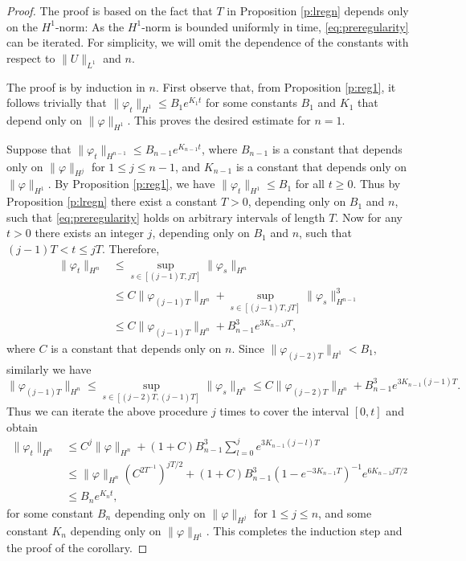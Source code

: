 \documentclass[11pt,a4paper,DIV11]{scrartcl}	%
\begin{document}
\begin{proof}
The proof is based on the fact that $T$ in Proposition \ref{p:lregn} depends only on the $H^1$-norm: As the $H^1$-norm is bounded uniformly in time, \eqref{eq:preregularity} can be iterated. 
  For simplicity, we will omit the dependence of the constants with respect
  to $\| U \|_{L^1}$ and $n$.

  The proof is by induction in $n$. First observe that, from Proposition
  \ref{p:reg1}, it follows trivially that $\| \varphi_t \|_{H^1} \le B_1
  e^{K_1 t}$ for some constants $B_1$ and $K_1$ that depend only on $\|
  \varphi \|_{H^1}$. This proves the desired estimate for $n=1$.

  Suppose that $\| \varphi_t \|_{H^{n-1}} \le B_{n-1} e^{K_{n-1} t}$, where
  $B_{n-1}$ is a constant that depends only on $\| \varphi \|_{H^j}$ for $1
  \le j \le n-1$, and $K_{n-1}$ is a constant that depends only on $\|
  \varphi \|_{H^1}$. By Proposition \ref{p:reg1}, we have $\| \varphi_t
  \|_{H^1} \le B_1$ for all $t \ge 0$.
%
 Thus by Proposition \ref{p:lregn} there exist a constant $T>0$, depending 
  only on $B_1$ and $n$, such that \eqref{eq:preregularity} holds on arbitrary intervals of length $T$. Now for
 any $t > 0$ there exists an integer $j$, depending
  only on $B_1$ and $n$, such that $(j-1)T < t \le jT$. Therefore,
%
  \begin{align*}
    \| \varphi_t \|_{H^n} & \le \sup_{s \in [(j-1)T, jT]} \| \varphi_s
    \|_{H^n} \\
    & \le C \| \varphi_{(j-1)T} \|_{H^n} + \sup_{s \in [(j-1)T, jT]} \|
    \varphi_s \|_{H^{n-1}}^3 \\
    & \le C \| \varphi_{(j-1)T} \|_{H^n} + B_{n-1}^3 e^{3 K_{n-1} j T},
  \end{align*}
  where $C$ is a constant that depends only on $n$. Since $\|
  \varphi_{(j-2)T} \|_{H^1} < B_1$, similarly we have
  \[
    \| \varphi_{(j-1)T} \|_{H^n} \le \sup_{s \in [(j-2)T, (j-1)T]} \|
    \varphi_s \|_{H^n} \le C \|
    \varphi_{(j-2)T} \|_{H^n} + B_{n-1}^3 e^{3 K_{n-1} (j-1)T}.
  \]
  Thus we can iterate the above procedure $j$ times to cover the interval
  $[0,t]$ and obtain
  \begin{align*}
    \| \varphi_t \|_{H^n} & \le C^j \| \varphi \|_{H^n} + (1+C) B_{n-1}^3
    \sum_{l=0}^j e^{3 K_{n-1} (j-l)T} \\
    & \le \| \varphi \|_{H^n} (C^{2 T^{-1}})^{jT/2} + (1+C) B_{n-1}^3
    (1-e^{-3K_{n-1} T})^{-1} e^{6 K_{n-1} jT/2} \\
    & \le B_n e^{K_n t},
  \end{align*}
  for some constant $B_n$ depending only on $\| \varphi \|_{H^j}$ for $1 \le
  j \le n$, and some constant $K_n$ depending only on $\| \varphi \|_{H^1}$.
  This completes the induction step and the proof of the corollary.
\end{proof}
\end{document}
